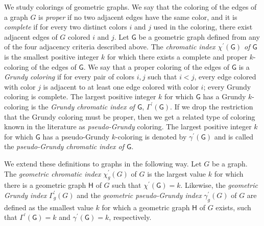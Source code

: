 \documentclass[11pt]{article}
\begin{document}
We study colorings of geometric graphs. We say that the coloring of the edges of a graph $G$ is \emph{proper} if no two adjacent edges have the same color, and it is \emph{complete} if for every two distinct colors $i$ and $j$ used in the coloring, there exist adjacent edges of $G$ colored $i$ and $j$. Let $\mathsf{G}$ be a geometric graph defined from any of the four adjacency criteria described above. The \emph{chromatic index $\chi^{'}(\mathsf{G})$ of $\mathsf{G}$} is the smallest positive integer $k$ for which there exists a complete and proper $k$-coloring of the edges of $\mathsf{G}$. We say that a proper coloring of the edges of $\mathsf{G}$ is a \emph{Grundy coloring} if for every pair of colors $i,j$ such that $i < j$, every edge colored with color $j$ is adjacent to at least one edge colored with color $i$; every Grundy coloring is complete. The largest positive integer $k$ for which $\mathsf{G}$ has a Grundy $k$-coloring is the \emph{Grundy chromatic index of $\mathsf{G}$}, $\Gamma^{'}(\mathsf{G})$. If we drop the restriction that the Grundy coloring must be proper, then we get a related type of coloring known in the literature as \emph{pseudo-Grundy} coloring. The largest positive integer $k$ for which $\mathsf{G}$ has a pseudo-Grundy $k$-coloring is denoted by $\gamma^{'}(\mathsf{G})$ and is called the \emph{pseudo-Grundy chromatic index of $\mathsf{G}$}. 

We extend these definitions to graphs in the following way. Let $G$ be a graph. The \emph{geometric chromatic index} $\chi_g^{'}(G)$ of $G$ is the largest value $k$ for which there is a geometric graph $\mathsf{H}$ of $G$ such that $\chi^{'}(\mathsf{G}) = k$. Likewise, the \emph{geometric Grundy index} $\Gamma_g^{'}(G)$ and the \emph{geometric pseudo-Grundy index} $\gamma_g^{'}(G)$ of $G$ are defined as the smallest value $k$ for which a geometric graph $\mathsf{H}$ of $G$ exists, such that $\Gamma^{'}(\mathsf{G}) = k$ and $\gamma^{'}(\mathsf{G}) = k$, respectively. 
\end{document}
